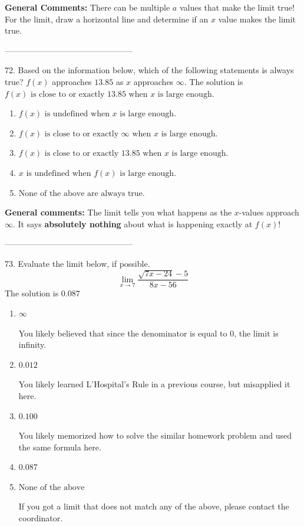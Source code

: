 \documentclass{extbook}[14pt]
\begin{document}
\textbf{General Comments:} There can be multiple $a$ values that make the limit true! For the limit, draw a horizontal line and determine if an $x$ value makes the limit true.

-----------------------------------------------

72. Based on the information below, which of the following statements is always true?
$f(x)$ approaches $13.85$ as $x$ approaches $\infty$. 
The solution is $ f(x) \text{ is close to or exactly } 13.85 \text{ when } x \text{ is large enough}. $ 

\begin{enumerate}[label=\Alph*.] 
\item $ f(x) \text{ is undefined when } x \text{ is large enough}. $ 

  
\item $ f(x) \text{ is close to or exactly } \infty \text{ when } x \text{ is large enough}. $ 

  
\item $ f(x) \text{ is close to or exactly } 13.85 \text{ when } x \text{ is large enough}. $ 

  
\item $ x \text{ is undefined when } f(x) \text{ is large enough}. $ 

  
\item $ \text{None of the above are always true.} $ 

  
\end{enumerate} 
 
\textbf{General comments:} The limit tells you what happens as the $x$-values approach $\infty$. It says \textbf{absolutely nothing} about what is happening exactly at $f(x)$!

-----------------------------------------------

73. Evaluate the limit below, if possible.
\[ \lim_{x \rightarrow 7} \frac{\sqrt{7x - 24} - 5}{8x - 56} \] 
The solution is $ 0.087 $ 

\begin{enumerate}[label=\Alph*.] 
\item $ \infty $ 

 You likely believed that since the denominator is equal to 0, the limit is infinity. 
\item $ 0.012 $ 

 You likely learned L'Hospital's Rule in a previous course, but misapplied it here. 
\item $ 0.100 $ 

 You likely memorized how to solve the similar homework problem and used the same formula here. 
\item $ 0.087 $ 

  
\item $ \text{None of the above} $ 

 If you got a limit that does not match any of the above, please contact the coordinator. 
\end{enumerate} 
 
\end{document}
